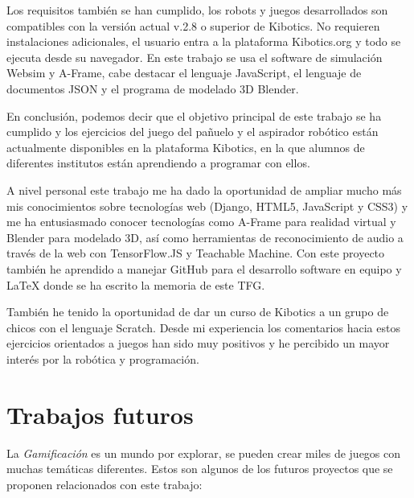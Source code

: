 Los requisitos  también se han cumplido, los robots y juegos desarrollados son compatibles con la versión actual v.2.8 o superior de Kibotics. No requieren instalaciones adicionales, el usuario entra a la plataforma Kibotics.org y todo se ejecuta desde su navegador.  En este trabajo se usa el software de simulación Websim y A-Frame, cabe destacar el lenguaje JavaScript, el lenguaje de documentos JSON y el programa de modelado 3D Blender.

En conclusión,  podemos decir que el objetivo principal de este trabajo se ha cumplido y los ejercicios del juego del pañuelo y el aspirador robótico están actualmente disponibles en la plataforma Kibotics, en la que alumnos de diferentes institutos están aprendiendo a programar con ellos.

A nivel personal este trabajo me ha dado la oportunidad de ampliar mucho más mis conocimientos sobre tecnologías web (Django, HTML5, JavaScript y CSS3) y me ha entusiasmado conocer tecnologías como A-Frame para realidad virtual y Blender para modelado 3D, así como herramientas de reconocimiento de audio a través de la web con TensorFlow.JS y Teachable Machine.
Con este proyecto también he aprendido a manejar GitHub para el desarrollo software en equipo y LaTeX donde se ha escrito la memoria de este TFG.

También he tenido la oportunidad de dar un curso de Kibotics a un grupo de chicos con el lenguaje Scratch. Desde mi experiencia los comentarios hacia estos ejercicios orientados a juegos han sido muy positivos y he percibido un mayor interés por la robótica y programación.

    
\section{Trabajos futuros}

La \textit{Gamificación} es un mundo por explorar, se pueden crear miles de juegos con muchas temáticas diferentes. Estos son algunos de los futuros proyectos que se proponen relacionados con este trabajo:

